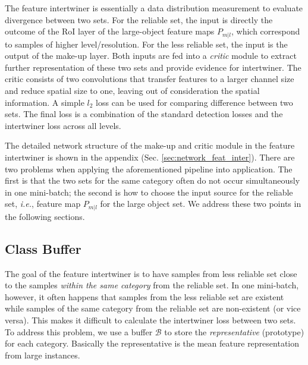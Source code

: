 \documentclass{article} \usepackage{iclr2019_conference,times}
\begin{document}
The feature intertwiner is essentially a data distribution measurement to evaluate divergence between two sets. For the reliable set, the input is directly the outcome of the RoI layer of the large-object feature maps $P_{m|l}$, which correspond to samples of higher level/resolution.
For the less reliable set, the input is the output of the make-up layer.
Both inputs are fed into a \textit{critic} module
to extract further representation of these two sets and provide evidence for intertwiner. 
The critic consists of two convolutions that transfer features to a larger channel size 
and reduce spatial size to one, leaving out of consideration the spatial information.
A simple $l_2$ loss can be used for comparing difference between two sets.
The final loss is a combination of the standard detection losses \citep{ross15_fast_rcnn} and the intertwiner loss across all levels.


The detailed network structure of the make-up and critic module in the feature intertwiner is shown in the appendix (Sec. \ref{sec:network_feat_inter}). There are two problems when applying the aforementioned pipeline into application. The first is that the two sets for the same category often do not occur simultaneously in one mini-batch; the second is how to choose the input source for the reliable set, \textit{i.e.}, feature map $P_{m | l}$ for the large object set. We address these two points in the following sections.





\subsection{Class Buffer}
The goal of the feature intertwiner is to have samples from less reliable set close to the samples \emph{within the same category} from the reliable set.
In one mini-batch, however, it often happens that samples from the less reliable set are existent while samples of the same category from the reliable set are non-existent (or vice versa). This makes it difficult to calculate the intertwiner loss between two sets.
To address this problem, we use a  {buffer} $\mathcal{B}$
to store the \textit{representative} (prototype) for each category. Basically the representative is the mean feature representation  from large instances.
\end{document}
